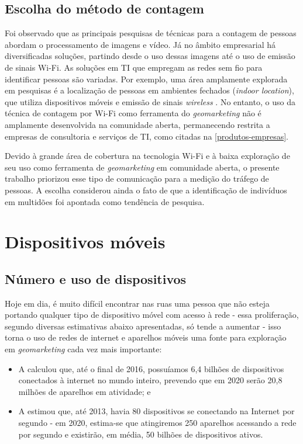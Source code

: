 \subsection{Escolha do método de contagem}
Foi observado que as principais pesquisas de técnicas para a contagem de pessoas abordam o processamento de imagens e vídeo. Já no âmbito empresarial
há diversificadas soluções, partindo desde o uso dessas imagens até o uso de emissão de sinais Wi-Fi.
As soluções em TI que empregam as redes sem fio para identificar pessoas são variadas. Por exemplo,
uma área amplamente explorada em pesquisas é a localização de pessoas em
ambientes fechados (\emph{indoor location}), que utiliza dispositivos móveis e emissão de sinais \emph{wireless} \cite{Ferreira2016}
\cite{Puhl2016} \cite{Figuera2011}. No entanto, o uso da técnica de contagem por Wi-Fi como ferramenta do \emph{geomarketing} não é amplamente desenvolvida na comunidade aberta, permanecendo restrita a empresas de consultoria e serviços de TI, como citadas na \autoref{produtos-empresas}.

Devido à grande área de cobertura na tecnologia Wi-Fi e à baixa exploração de seu uso como ferramenta de \emph{geomarketing} em comunidade aberta, o presente trabalho priorizou esse tipo de comunicação para a medição do tráfego de pessoas. A escolha considerou ainda o fato de que a identificação de indivíduos em multidões foi apontada como tendência de pesquisa.


\section{Dispositivos móveis}

\subsection{Número e uso de dispositivos}

Hoje em dia, é muito difícil encontrar nas ruas uma pessoa que não esteja portando qualquer tipo de dispositivo móvel com acesso à rede - essa proliferação, segundo diversas estimativas abaixo apresentadas, só tende a aumentar - isso torna o uso de redes de internet e aparelhos móveis uma fonte para exploração em \emph{geomarketing} cada vez mais importante:
\begin{itemize}
\item A  calculou que, até o final de 2016, possuíamos 6,4 bilhões de dispositivos conectados à internet no mundo inteiro, prevendo que em 2020 serão 20,8 milhões de aparelhos em atividade; e
\item A  estimou que, até 2013, havia 80 dispositivos se conectando na Internet por segundo - em 2020, estima-se que atingiremos 250 aparelhos acessando a rede por segundo e existirão, em média, 50 bilhões de dispositivos ativos.
\end{itemize}

